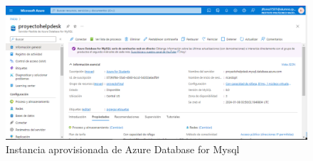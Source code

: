 \begin{figure}[H]
	\centering
	\includegraphics[width=1.1\textwidth]{CapituloImplem/Img/BasedeDatosAzue}
	\caption{Instancia aprovisionada de Azure Database for Mysql}
	\label{fig:mysqldatazure}
\end{figure}

